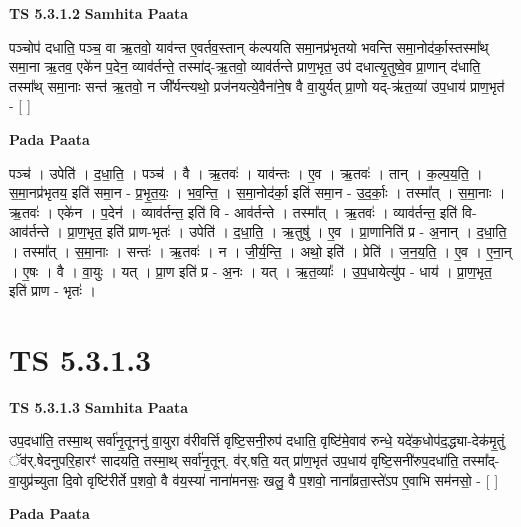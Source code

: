 \documentclass[17pt]{extarticle}
\begin{document}
\textbf{TS 5.3.1.2 } \newline
\textbf{Samhita Paata} \newline

पञ्चोप॑ दधाति॒ पञ्च॒ वा ऋ॒तवो॒ याव॑न्त ए॒वर्तव॒स्तान् क॑ल्पयति समा॒नप्र॑भृतयो भवन्ति समा॒नोद॑र्का॒स्तस्मा᳚थ् समा॒ना ऋ॒तव॒ एके॑न प॒देन॒ व्याव॑र्तन्ते॒ तस्मा॑द्-ऋ॒तवो॒ व्याव॑र्तन्ते प्राण॒भृत॒ उप॑ दधात्यृ॒तुष्वे॒व प्रा॒णान् द॑धाति॒ तस्मा᳚थ् समा॒नाः सन्त॑ ऋ॒तवो॒ न जी᳚र्यन्त्यथो॒ प्रज॑नयत्ये॒वैना॑ने॒ष वै वा॒युर्यत् प्रा॒णो यद्-ऋ॑त॒व्या॑ उप॒धाय॑ प्राण॒भृत॑ - [  ] \newline

\textbf{Pada Paata} \newline

पञ्च॑ । उपेति॑ । द॒धा॒ति॒ । पञ्च॑ । वै । ऋ॒तवः॑ । याव॑न्तः । ए॒व । ऋ॒तवः॑ । तान् । क॒ल्प॒य॒ति॒ । स॒मा॒नप्र॑भृतय॒ इति॑ समा॒न - प्र॒भृ॒त॒यः॒ । भ॒व॒न्ति॒ । स॒मा॒नोद॑र्का॒ इति॑ समा॒न - उ॒द॒र्काः॒ । तस्मा᳚त् । स॒मा॒नाः । ऋ॒तवः॑ । एके॑न । प॒देन॑ । व्याव॑र्तन्त॒ इति॑ वि - आव॑र्तन्ते । तस्मा᳚त् । ऋ॒तवः॑ । व्याव॑र्तन्त॒ इति॑ वि-आव॑र्तन्ते । प्रा॒ण॒भृत॒ इति॑ प्राण-भृतः॑ । उपेति॑ । द॒धा॒ति॒ । ऋ॒तुषु॑ । ए॒व । प्रा॒णानिति॑ प्र - अ॒नान् । द॒धा॒ति॒ । तस्मा᳚त् । स॒मा॒नाः । सन्तः॑ । ऋ॒तवः॑ । न । जी॒र्य॒न्ति॒ । अथो॒ इति॑ । प्रेति॑ । ज॒न॒य॒ति॒ । ए॒व । ए॒ना॒न् । ए॒षः । वै । वा॒युः । यत् । प्रा॒ण इति॑ प्र - अ॒नः । यत् । ऋ॒त॒व्याः᳚ । उ॒प॒धायेत्यु॑प - धाय॑ । प्रा॒ण॒भृत॒ इति॑ प्राण - भृतः॑ ।  \newline




\section*{ TS 5.3.1.3 }

\textbf{TS 5.3.1.3 } \newline
\textbf{Samhita Paata} \newline

उप॒दधा॑ति॒ तस्मा॒थ् सर्वा॑नृ॒तूननु॑ वा॒युरा व॑रीवर्त्ति वृष्टि॒सनी॒रुप॑ दधाति॒ वृष्टि॑मे॒वाव॑ रुन्धे॒ यदे॑क॒धोप॑द॒द्ध्या-देक॑मृ॒तुं ॅव॑र्.षेदनुपरि॒हारꣳ॑ सादयति॒ तस्मा॒थ् सर्वा॑नृ॒तून्. व॑र्.षति॒ यत् प्रा॑ण॒भृत॑ उप॒धाय॑ वृष्टि॒सनी॑रुप॒दधा॑ति॒ तस्मा᳚द्-वा॒युप्र॑च्युता दि॒वो वृष्टि॑रीर्ते प॒शवो॒ वै व॑य॒स्या॑ नाना॑मनसः॒ खलु॒ वै प॒शवो॒ नाना᳚व्रता॒स्ते॑ऽप ए॒वाभि सम॑नसो॒ - [  ] \newline

\textbf{Pada Paata} \newline
\end{document}
